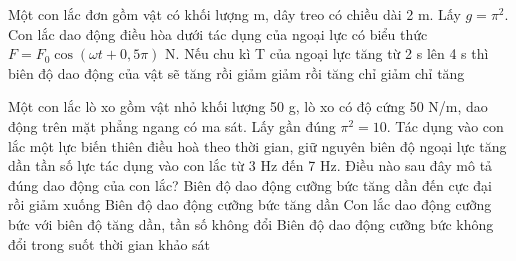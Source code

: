 \begin{ex}%
Một con lắc đơn gồm vật có khối lượng m, dây treo có chiều dài 2 m. Lấy $g=\pi^2$. Con lắc dao động điều hòa dưới tác dụng của ngoại lực có biểu thức $F = F_0\cos \left(\omega t + 0,5\pi\right)$ N. Nếu chu kì T của ngoại lực tăng từ 2 s lên 4 s thì biên độ dao động của vật sẽ
\choice
{\True tăng rồi giảm}
{giảm rồi tăng}
{chỉ giảm}
{chỉ tăng}
\end{ex} 
\begin{ex}%
Một con lắc lò xo gồm vật nhỏ khối lượng 50 g, lò xo có độ cứng 50 N/m, dao động trên mặt phẳng ngang có ma sát. Lấy gần đúng ${\pi^2} = 10$. Tác dụng vào con lắc một lực biến thiên điều hoà theo thời gian, giữ nguyên biên độ ngoại lực tăng dần tần số lực tác dụng vào con lắc từ 3 Hz đến 7 Hz. Điều nào sau đây mô tả đúng dao động của con lắc?
\choice
{\True Biên độ dao động cưỡng bức tăng dần đến cực đại rồi giảm xuống}
{Biên độ dao động cưỡng bức tăng dần}
{Con lắc dao động cưỡng bức với biên độ tăng dần, tần số không đổi}
{Biên độ dao động cưỡng bức không đổi trong suốt thời gian khảo sát}
\end{ex} 
